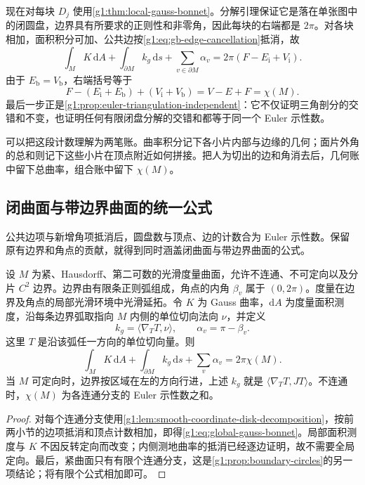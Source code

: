 \ProseParagraphBreak

现在对每块 \(D_j\) 使用\cref{g1:thm:local-gauss-bonnet}。分解引理保证它是落在单张图中的闭圆盘，边界具有所要求的正则性和非零角，因此每块的右端都是 \(2\pi\)。对各块相加，面积积分可加、公共边按\eqref{g1:eq:gb-edge-cancellation}抵消，故
\[
	\int_MK\,\mathrm{d}A+\int_{\partial M}k_g\,\mathrm{d}s
	+\sum_{v\in\partial M}\alpha_v
	=2\pi(F-E_{\mathrm i}+V_{\mathrm i}).
\]
由于 \(E_{\mathrm b}=V_{\mathrm b}\)，右端括号等于
\[
	F-(E_{\mathrm i}+E_{\mathrm b})+(V_{\mathrm i}+V_{\mathrm b})=V-E+F=\chi(M).
\]
最后一步正是\cref{g1:prop:euler-triangulation-independent}：它不仅证明三角剖分的交错和不变，也证明任何有限闭盘分解的交错和都等于同一个 Euler 示性数。

\ProseParagraphBreak

可以把这段计数理解为两笔账。曲率积分记下各小片内部与边缘的几何；面片外角的总和则记下这些小片在顶点附近如何拼接。把人为切出的边和角消去后，几何账中留下总曲率，组合账中留下 \(\chi(M)\)。

\subsection{闭曲面与带边界曲面的统一公式}
\label{g1:subsec:0904:04}

公共边项与新增角项抵消后，圆盘数与顶点、边的计数合为 Euler 示性数。保留原有边界和角点的贡献，就得到同时涵盖闭曲面与带边界曲面的公式。

\begin{theorem}\label{g1:thm:global-gauss-bonnet}
	设 \(M\) 为紧、Hausdorff、第二可数的光滑度量曲面，允许不连通、不可定向以及分片 \(C^2\) 边界。边界由有限条正则弧组成，角点的内角 \(\beta_v\) 属于 \((0,2\pi)\)。度量在边界及角点的局部光滑环境中光滑延拓。令 \(K\) 为 Gauss 曲率，\(\mathrm{d}A\) 为度量面积测度，沿每条边界弧取指向 \(M\) 内侧的单位切向法向 \(\nu\)，并定义
	\[
		k_g=\langle\nabla_TT,\nu\rangle,\qquad \alpha_v=\pi-\beta_v.
	\]
	这里 \(T\) 是沿该弧任一方向的单位切向量。则
	\begin{equation}\label{g1:eq:global-gauss-bonnet}
		\int_MK\,\mathrm{d}A+\int_{\partial M}k_g\,\mathrm{d}s+\sum_v\alpha_v
		=2\pi\chi(M).
	\end{equation}
	当 \(M\) 可定向时，边界按区域在左的方向行进，上述 \(k_g\) 就是 \(\langle\nabla_TT,JT\rangle\)。不连通时，\(\chi(M)\) 为各连通分支的 Euler 示性数之和。
\end{theorem}
\begin{proof}
	对每个连通分支使用\cref{g1:lem:smooth-coordinate-disk-decomposition}，按前两小节的边项抵消和顶点计数相加，即得\eqref{g1:eq:global-gauss-bonnet}。局部面积测度与 \(K\) 不因反转定向而改变；内侧测地曲率的抵消已经逐边证明，故不需要全局定向。最后，紧曲面只有有限个连通分支，这是\cref{g1:prop:boundary-circles}的另一项结论；将有限个公式相加即可。
\end{proof}

